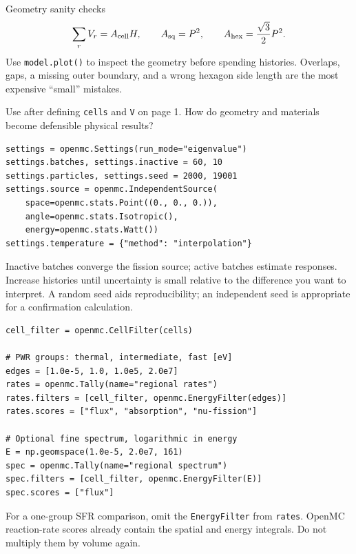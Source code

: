 \documentclass{ne630handout}
\begin{document}
\begin{KeyBox}{Geometry sanity checks}
\vspace{-2pt}
\[
 \sum_rV_r=A_{\rm cell}H,\qquad
 A_{\rm sq}=P^2,\qquad A_{\rm hex}=\frac{\sqrt3}{2}P^2.
\]
Use \texttt{model.plot()} to inspect the geometry before spending histories.
Overlaps, gaps, a missing outer boundary, and a wrong hexagon side length
are the most expensive ``small'' mistakes.
\end{KeyBox}
\colend

\newpage
{}
 {Use after defining \texttt{cells} and \texttt{V} on page 1.}
 {How do geometry and materials become defensible physical results?}

\colstart
{}
\begin{lstlisting}
settings = openmc.Settings(run_mode="eigenvalue")
settings.batches, settings.inactive = 60, 10
settings.particles, settings.seed = 2000, 19001
settings.source = openmc.IndependentSource(
    space=openmc.stats.Point((0., 0., 0.)),
    angle=openmc.stats.Isotropic(),
    energy=openmc.stats.Watt())
settings.temperature = {"method": "interpolation"}
\end{lstlisting}
Inactive batches converge the fission source; active batches estimate
responses.  Increase histories until uncertainty is small relative to the
difference you want to interpret.  A random seed aids reproducibility; an
independent seed is appropriate for a confirmation calculation.

\begin{lstlisting}
cell_filter = openmc.CellFilter(cells)

# PWR groups: thermal, intermediate, fast [eV]
edges = [1.0e-5, 1.0, 1.0e5, 2.0e7]
rates = openmc.Tally(name="regional rates")
rates.filters = [cell_filter, openmc.EnergyFilter(edges)]
rates.scores = ["flux", "absorption", "nu-fission"]

# Optional fine spectrum, logarithmic in energy
E = np.geomspace(1.0e-5, 2.0e7, 161)
spec = openmc.Tally(name="regional spectrum")
spec.filters = [cell_filter, openmc.EnergyFilter(E)]
spec.scores = ["flux"]
\end{lstlisting}
For a one-group SFR comparison, omit the \texttt{EnergyFilter} from
\texttt{rates}.  OpenMC reaction-rate scores already contain the spatial
and energy integrals.  Do not multiply them by volume again.
\end{document}
